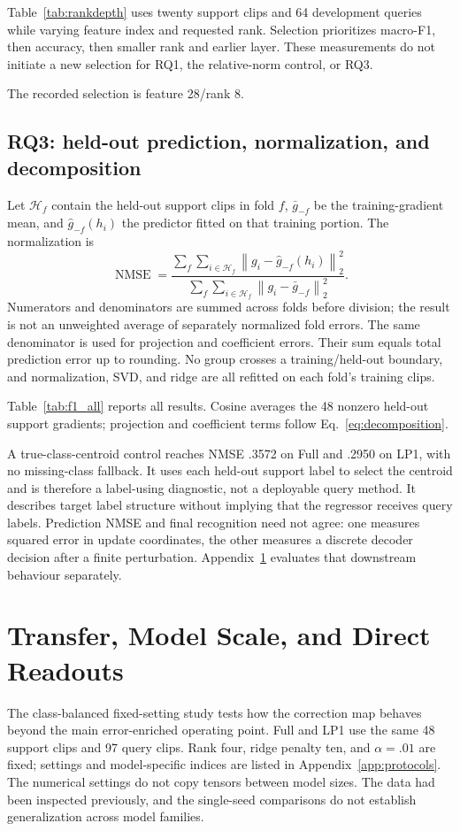 \documentclass{article}
\newcommand{\norm}[1]{\left\lVert#1\right\rVert}
\begin{document}
Table~\ref{tab:rankdepth} uses twenty support clips and 64 development queries while varying feature index and requested rank. Selection prioritizes macro-F1, then accuracy, then smaller rank and earlier layer. These measurements do not initiate a new selection for RQ1, the relative-norm control, or RQ3.


The recorded selection is feature 28/rank 8.

\subsection{RQ3: held-out prediction, normalization, and decomposition}
\label{app:rq3}
\label{app:completed_f1}
Let $\mathcal H_f$ contain the held-out support clips in fold $f$, $\bar g_{-f}$ be the training-gradient mean, and $\widehat g_{-f}(h_i)$ the predictor fitted on that training portion. The normalization is
\begin{equation}
\operatorname{NMSE}=
\frac{\sum_f\sum_{i\in\mathcal H_f}\norm{g_i-\widehat g_{-f}(h_i)}_2^2}
{\sum_f\sum_{i\in\mathcal H_f}\norm{g_i-\bar g_{-f}}_2^2}.
\label{eq:nmse}
\end{equation}
Numerators and denominators are summed across folds before division; the result is not an unweighted average of separately normalized fold errors. The same denominator is used for projection and coefficient errors. Their sum equals total prediction error up to rounding. No group crosses a training/held-out boundary, and normalization, SVD, and ridge are all refitted on each fold's training clips.


Table~\ref{tab:f1_all} reports all results. Cosine averages the 48 nonzero held-out support gradients; projection and coefficient terms follow Eq.~\ref{eq:decomposition}.

A true-class-centroid control reaches NMSE .3572 on Full and .2950 on LP1, with no missing-class fallback. It uses each held-out support label to select the centroid and is therefore a label-using diagnostic, not a deployable query method. It describes target label structure without implying that the regressor receives query labels. Prediction NMSE and final recognition need not agree: one measures squared error in update coordinates, the other measures a discrete decoder decision after a finite perturbation. Appendix~\ref{app:extensions} evaluates that downstream behaviour separately.

\clearpage
\section{Transfer, Model Scale, and Direct Readouts}
\label{app:extensions}
\label{app:closing_protocol}
The class-balanced fixed-setting study tests how the correction map behaves beyond the main error-enriched operating point. Full and LP1 use the same 48 support clips and 97 query clips. Rank four, ridge penalty ten, and $\alpha=.01$ are fixed; settings and model-specific indices are listed in Appendix~\ref{app:protocols}. The numerical settings do not copy tensors between model sizes. The data had been inspected previously, and the single-seed comparisons do not establish generalization across model families.
\end{document}
